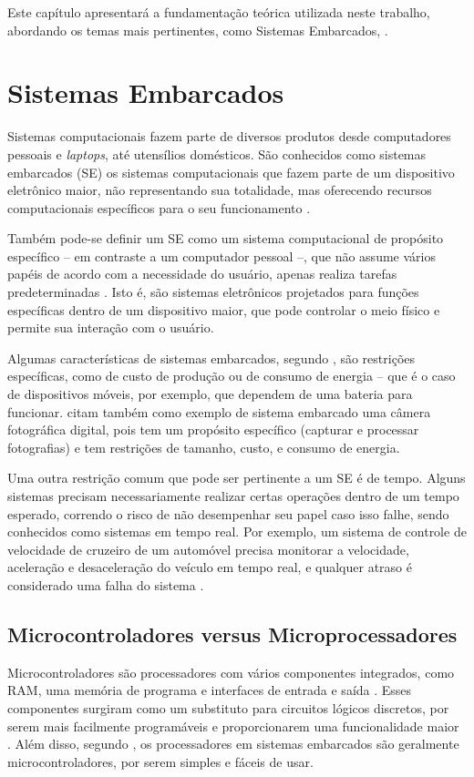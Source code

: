 Este capítulo apresentará a fundamentação teórica utilizada neste trabalho, abordando os temas mais pertinentes, como Sistemas Embarcados, .

\section{Sistemas Embarcados}
\label{sec:embarcados}
Sistemas computacionais fazem parte de diversos produtos desde computadores pessoais e \textit{laptops}, até utensílios domésticos. São conhecidos como sistemas embarcados (SE) os sistemas computacionais que fazem parte de um dispositivo eletrônico maior, não representando sua totalidade, mas oferecendo recursos computacionais específicos para o seu funcionamento \cite{vahid:2002}.

Também pode-se definir um SE como um sistema computacional de propósito específico -- em contraste a um computador pessoal --, que não assume vários papéis de acordo com a necessidade do usuário, apenas realiza tarefas predeterminadas \cite{heath:2002}. Isto é, são sistemas eletrônicos projetados para funções específicas dentro de um dispositivo maior, que pode controlar o meio físico e permite sua interação com o usuário.

Algumas características de sistemas embarcados, segundo , são restrições específicas, como de custo de produção ou de consumo de energia -- que é o caso de dispositivos móveis, por exemplo, que dependem de uma bateria para funcionar.  citam também como exemplo de sistema embarcado uma câmera fotográfica digital, pois tem um propósito específico (capturar e processar fotografias) e tem restrições de tamanho, custo, e consumo de energia.

Uma outra restrição comum que pode ser pertinente a um SE é de tempo. Alguns sistemas precisam necessariamente realizar certas operações dentro de um tempo esperado, correndo o risco de não desempenhar seu papel caso isso falhe, sendo conhecidos como sistemas em tempo real. Por exemplo, um sistema de controle de velocidade de cruzeiro de um automóvel precisa monitorar a velocidade, aceleração e desaceleração do veículo em tempo real, e qualquer atraso é considerado uma falha do sistema \cite{vahid:2002}.

\subsection{Microcontroladores versus Microprocessadores}
Microcontroladores são processadores com vários componentes integrados, como RAM, uma memória de programa e interfaces de entrada e saída \cite{white:2011}. Esses componentes surgiram como um substituto para circuitos lógicos discretos, por serem mais facilmente programáveis e proporcionarem uma funcionalidade maior \cite{heath:2002}. Além disso, segundo , os processadores em sistemas embarcados são geralmente microcontroladores, por serem simples e fáceis de usar.

